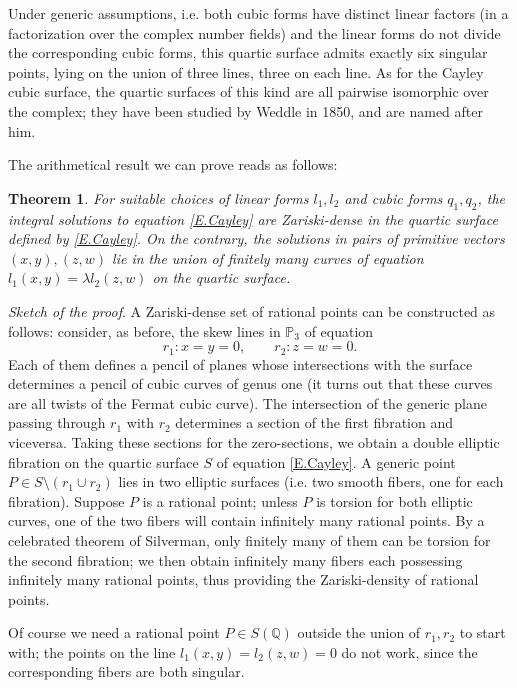 \documentclass[leqno,12pt]{article} %
\def\Q{{{\mathbb Q}}}
\def\P{{{\mathbb P}}}
\theoremstyle{plain} %
\newtheorem{theorem}{\indent\sc Theorem}[section]
\theoremstyle{definition} %
\begin{document}
Under generic assumptions, i.e. both cubic forms have distinct linear factors (in a factorization over the complex number fields) and the linear forms do not divide the corresponding cubic forms, this quartic surface admits exactly six singular points, lying on the union of three lines, three on each line. As for the Cayley cubic surface, the quartic surfaces of this kind are all pairwise isomorphic over the complex; they have been studied by Weddle in 1850, and are named after him. 


The arithmetical result we can prove reads as follows:

\begin{theorem}\label{T.Weddle}
For suitable choices of linear forms $l_1,l_2$ and cubic forms $q_1,q_2$, the integral solutions to equation \eqref{E.Cayley} are Zariski-dense in the quartic surface defined by \eqref{E.Cayley}. On the contrary, the solutions in pairs of primitive vectors $(x,y), (z,w)$ lie in the union of finitely many curves of equation $l_1(x,y)=\lambda l_2(z,w)$ on the quartic surface.
\end{theorem}

  
 {\it Sketch of the proof}.  A Zariski-dense set of rational points can be constructed as follows: consider, as before,  the skew lines  in $\P_3$ of equation 
$$
r_1: x=y=0,\qquad r_2: z=w=0.
$$ 
Each of them defines a pencil of planes whose intersections with the surface determines a pencil of cubic curves of genus one (it turns out that these curves are all twists of the Fermat cubic curve). The intersection of the generic plane passing through $r_1$ with $r_2$ determines a section of the first fibration and viceversa. Taking these sections for the zero-sections, we obtain a double elliptic fibration on the quartic surface $S$ of equation  \eqref{E.Cayley}. A generic point $P\in S  \setminus (r_1\cup r_2)$ lies in two elliptic surfaces (i.e. two smooth fibers, one for each fibration). Suppose $P$ is a rational point; unless $P$ is torsion for both elliptic curves,  one of the two fibers will contain infinitely many rational points. By a celebrated theorem of Silverman, only finitely many of them can be torsion for the second fibration; we then obtain infinitely many fibers each possessing infinitely many rational points, thus providing the Zariski-density of rational points. 

Of course we need a rational point $P\in S(\Q)$ outside the union of $r_1,r_2$ to start with; the points on the line $l_1(x,y)=l_2(z,w)=0$ do not work, since the corresponding fibers are both singular. 
\end{document}
